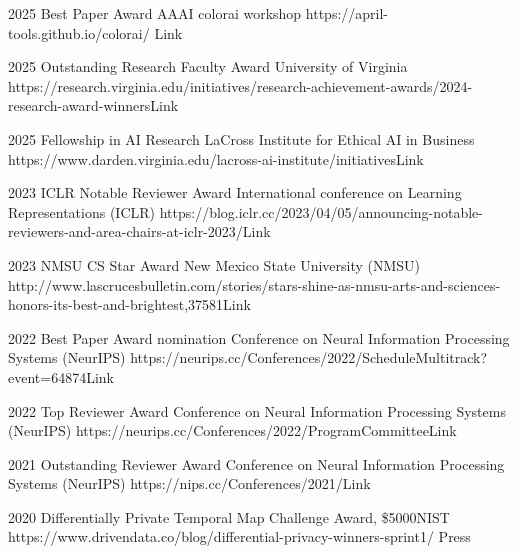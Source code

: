 \begin{awards}
	\awardentry
	{2025}
	{Best Paper Award}
	{AAAI colorai workshop}
	{https://april-tools.github.io/colorai/}
	{Link}

	\awardentry
	{2025}
	{Outstanding Research Faculty Award}
	{University of Virginia}%
	{https://research.virginia.edu/initiatives/research-achievement-awards/2024-research-award-winners}{Link}

	\awardentry
	{2025}
	{Fellowship in AI Research}
	{LaCross Institute for Ethical AI in Business}%
	{https://www.darden.virginia.edu/lacross-ai-institute/initiatives}{Link}

	\awardentry
	{2023}
	{ICLR Notable Reviewer Award}%
	{International conference on Learning Representations (ICLR)} 
	{https://blog.iclr.cc/2023/04/05/announcing-notable-reviewers-and-area-chairs-at-iclr-2023/}{Link}

	\awardentry
	{2023}
	{NMSU CS Star Award}%
	{New Mexico State University (NMSU)} 
	{http://www.lascrucesbulletin.com/stories/stars-shine-as-nmsu-arts-and-sciences-honors-its-best-and-brightest,37581}{Link}

	\awardentry
	{2022}
	{Best Paper Award nomination}%
	{Conference on Neural Information Processing Systems (NeurIPS)} 
	{https://neurips.cc/Conferences/2022/ScheduleMultitrack?event=64874}{Link}

	\awardentry
	{2022}
	{Top Reviewer Award}%
	{Conference on Neural Information Processing Systems (NeurIPS)} 
	{https://neurips.cc/Conferences/2022/ProgramCommittee}{Link}

	\awardentry
	{2021}
	{Outstanding Reviewer Award}%
	{Conference on Neural Information Processing Systems (NeurIPS)} 
	{https://nips.cc/Conferences/2021/}{Link}

	\awardentry
	{2020}
	{Differentially Private Temporal Map Challenge Award, \$5000}{NIST}
	{https://www.drivendata.co/blog/differential-privacy-winners-sprint1/}
	{Press}


\end{awards}
